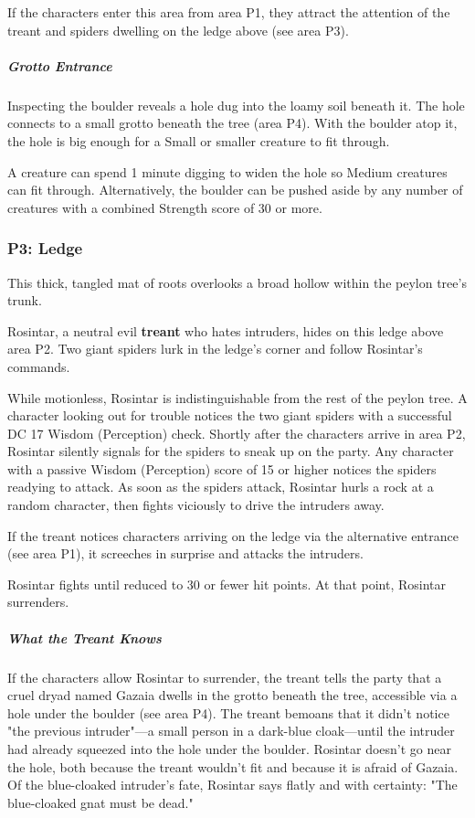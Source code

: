 \documentclass[10pt,a4paper,twoside,bg=print,twocolumn,openany,nodeprecatedcode]{dndbook}
\begin{document}
If the characters enter this area from area P1, they attract the attention of the treant and spiders dwelling on the ledge above (see area P3).

\subparagraph{Grotto Entrance}
Inspecting the boulder reveals a hole dug into the loamy soil beneath it. The hole connects to a small grotto beneath the tree (area P4). With the boulder atop it, the hole is big enough for a Small or smaller creature to fit through.

A creature can spend 1 minute digging to widen the hole so Medium creatures can fit through. Alternatively, the boulder can be pushed aside by any number of creatures with a combined Strength score of 30 or more.

\subsubsection{P3: Ledge}
\begin{DndReadAloud}{}
This thick, tangled mat of roots overlooks a broad hollow within the peylon tree's trunk.

\end{DndReadAloud}

Rosintar, a neutral evil \textbf{treant} who hates intruders, hides on this ledge above area P2. Two giant spiders lurk in the ledge's corner and follow Rosintar's commands.

While motionless, Rosintar is indistinguishable from the rest of the peylon tree. A character looking out for trouble notices the two giant spiders with a successful DC 17 Wisdom (Perception) check. Shortly after the characters arrive in area P2, Rosintar silently signals for the spiders to sneak up on the party. Any character with a passive Wisdom (Perception) score of 15 or higher notices the spiders readying to attack. As soon as the spiders attack, Rosintar hurls a rock at a random character, then fights viciously to drive the intruders away.

If the treant notices characters arriving on the ledge via the alternative entrance (see area P1), it screeches in surprise and attacks the intruders.

Rosintar fights until reduced to 30 or fewer hit points. At that point, Rosintar surrenders.

\subparagraph{What the Treant Knows}
If the characters allow Rosintar to surrender, the treant tells the party that a cruel dryad named Gazaia dwells in the grotto beneath the tree, accessible via a hole under the boulder (see area P4). The treant bemoans that it didn't notice "the previous intruder"—a small person in a dark-blue cloak—until the intruder had already squeezed into the hole under the boulder. Rosintar doesn't go near the hole, both because the treant wouldn't fit and because it is afraid of Gazaia. Of the blue-cloaked intruder's fate, Rosintar says flatly and with certainty: "The blue-cloaked gnat must be dead."
\end{document}
